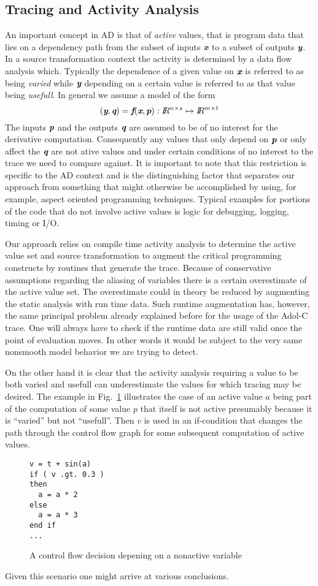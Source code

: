 \documentclass{article}
\newcommand{\R}{I\!\!R}
\newcommand{\bmf}{\mbox{\bf\em f}}
\newcommand{\bmp}{\mbox{\bf\em p}}
\newcommand{\bmq}{\mbox{\bf\em q}}
\newcommand{\bmx}{\mbox{\bf\em x}}
\newcommand{\bmy}{\mbox{\bf\em y}}
\newcommand{\reffig}[1]{{Fig.~\ref{#1}}}
\begin{document}
\subsection{Tracing and Activity Analysis}\label{sec:ActivityAnalysis}
An important concept in AD is that of {\em active} values, that is 
program data that lies on a dependency path from the subset of inputs $\bmx$ to 
a subset of outputs $\bmy$. 
In a source transformation context the activity is determined by a data flow 
analysis which. Typically the dependence of a given value on $\bmx$ is 
referred to as being {\em varied} while $\bmy$ depending on 
a certain value is referred to as that value being {\em usefull}.   
In general we assume a model of the form 
\[
(\bmy,\bmq)=\bmf(\bmx,\bmp): \R^{n\times s}\mapsto \R^{m\times t}
\]
The inputs $\bmp$ and the outputs $\bmq$  are assumed to be of no interest 
for the derivative computation. Consequently any values that only depend on
$\bmp$ or only affect the $\bmq$ are not ative values and  
under certain conditions of no interest to the trace we need to compare against. 
It is important to note that this restriction is specific to the AD context 
and is the distinguishing factor that separates our  approach  
from something that might otherwise be accomplished 
by using, for example, aspect oriented programming techniques. 
Typical examples for portions of the code that do not involve active values 
is logic for debugging, logging, timing or I/O.   

Our approach relies on compile time activity analysis to determine the active value set 
and source transformation to augment the critical programming constructs by 
routines that generate the trace. 
Because of conservative assumptions regarding the 
aliasing of variables there is a certain overestimate of the active value set. 
The overestimate could in theory be reduced by augmenting the static analysis 
with run time data. 
Such runtime augmentation has,  however,  the same principal problem already 
explained before for the usage of the Adol-C trace. 
One will always have to check 
if the runtime data are still valid once the point of evaluation moves. 
In other words it would be subject to the very same nonsmooth model behavior we are trying to detect.

On the other hand it is clear that the activity  analysis requiring a value 
to be both varied and usefull can underestimate 
the values for which tracing may be desired. 
The example in \reffig{fig:missedThis} illustrates the case of an active value  $a$
being part of the computation of some value $p$ that itself is not active presumably 
because it is ``varied'' but not ``usefull''.
Then $v$ is used in an if-condition that changes the path through the control flow 
graph for some  subsequent computation of active values.
\begin{figure}
\begin{lstlisting}
v = t + sin(a) 
if ( v .gt. 0.3 )
then 
  a = a * 2
else
  a = a * 3
end if 
...
\end{lstlisting}
\caption{A control flow decision depening on a nonactive variable}\label{fig:missedThis} 
\end{figure}
Given this scenario one might arrive at various conclusions. 
\end{document}
